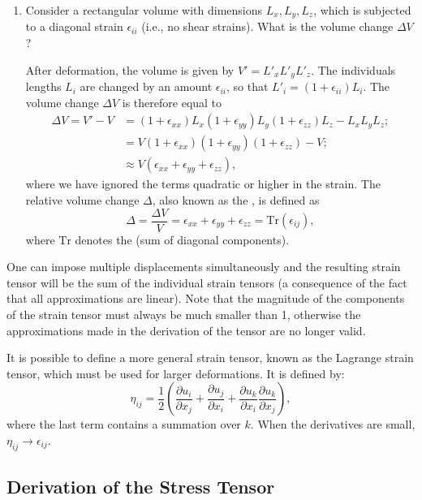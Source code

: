 \begin{enumerate}
\item Consider a rectangular volume with dimensions $L_x,L_y,L_z$, which is subjected to a diagonal strain $\epsilon_{ii}$ (i.e., no shear strains). What is the volume change $\Delta V$?  

After deformation, the volume is given by $V' = L'_xL'_yL'_z$.  The individuals lengths $L_i$ are changed by an amount $\epsilon_{ii}$, so that $L'_i = (1+\epsilon_{ii})L_i$.  The volume change $\Delta V$ is therefore equal to
\begin{align*}
\Delta V = V'-V &= (1+\epsilon_{xx})L_x(1+\epsilon_{yy})L_y(1+\epsilon_{zz})L_z - L_xL_yL_z;\\
&= V(1+\epsilon_{xx})(1+\epsilon_{yy})(1+\epsilon_{zz})-V;\\
&\approx V(\epsilon_{xx}+\epsilon_{yy}+\epsilon_{zz}),
\end{align*}
where we have ignored the terms quadratic or higher in the strain.  The relative volume change $\Delta$, also known as the , is defined as
\[
	\Delta = \frac{\Delta V}{V} = \epsilon_{xx}+\epsilon_{yy}+\epsilon_{zz} = \text{Tr}(\epsilon_{ij}),
\]
where $\text{Tr}$ denotes the  (sum of diagonal components).
\end{enumerate}

One can impose multiple displacements simultaneously and the resulting strain tensor will be the sum of the individual strain tensors (a consequence of the fact that all approximations are linear).  Note that the magnitude of the components of the strain tensor must always be much smaller than 1, otherwise the approximations made in the derivation of the tensor are no longer valid.  

It is possible to define a more general strain tensor, known as the Lagrange strain tensor, which must be used for larger deformations.  It is defined by:
 \[
	\eta_{ij} = \frac{1}{2}\left(\frac{\partial u_i}{\partial x_j} + \frac{\partial u_j}{\partial x_i} +
	\frac{\partial u_k}{\partial x_i}\frac{\partial u_k}{\partial x_j}\right),
\]
where the last term contains a summation over $k$.  When the derivatives are small, $\eta_{ij}\rightarrow\epsilon_{ij}$.  


\subsection{Derivation of the Stress Tensor}


